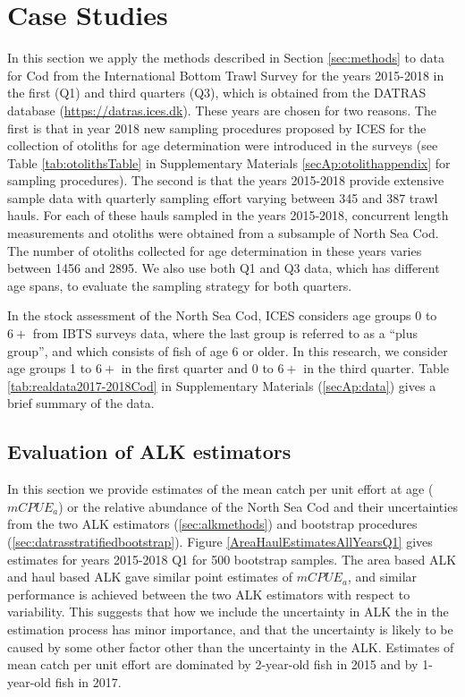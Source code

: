 \documentclass[a4paper 12pt]{article}
\numberwithin{equation}{section}
\begin{document}
\section{Case Studies}
\label{sec:data}
In this section we apply the methods described in Section \ref{sec:methods} to data for Cod from the International Bottom Trawl Survey for the years 2015-2018 in the first (Q1) and third quarters (Q3), which is obtained from the DATRAS database (\href{https://datras.ices.dk}{https://datras.ices.dk}). These years are chosen for two reasons. The first is that in year 2018 new sampling procedures proposed by ICES for the collection of otoliths for age determination were introduced in the surveys (see Table \ref{tab:otolithsTable} in Supplementary Materials \ref{secAp:otolithappendix} for sampling procedures). The second is that the years 2015-2018  provide extensive sample data with quarterly sampling effort varying between 345 and 387 trawl hauls.  For each of these hauls sampled in the years 2015-2018, concurrent length measurements and otoliths were obtained from a subsample of North Sea Cod. The number of otoliths collected for age determination in these years varies between 1456 and 2895. We also use both Q1 and Q3 data, which has different age spans, to evaluate the sampling strategy for both quarters. 

In the stock assessment of the North Sea Cod,  ICES considers age groups 0 to $6+$ from IBTS surveys data, where the last group is referred to as a ``plus group'', and which consists of fish of age 6 or older.  In this research, we consider age groups 1 to $6+$ in the first quarter and 0 to $6+$ in the third quarter. Table \ref{tab:realdata2017-2018Cod} in Supplementary Materials (\ref{secAp:data}) gives a brief summary of the data.

\subsection{Evaluation of ALK estimators}
\label{sec:EstimatesALK}
In this section we provide estimates of the mean catch per unit effort at age ($mCPUE_{a}$) or the relative abundance of the North Sea Cod  and their uncertainties from the two ALK estimators (\ref{sec:alkmethods}) and bootstrap procedures (\ref{sec:datrasstratifiedbootstrap}). Figure \ref{AreaHaulEstimatesAllYearsQ1} gives estimates for years 2015-2018 Q1 for 500 bootstrap samples. The area based ALK and haul based ALK gave similar point estimates of $mCPUE_{a}$, and similar performance is achieved between the two ALK estimators with respect to variability. This suggests that how we include the uncertainty in ALK the in the estimation process has minor importance, and that the uncertainty is likely to be caused by some other factor other than the uncertainty in the ALK. Estimates of mean catch per unit effort are dominated by  2-year-old fish in 2015 and by 1-year-old fish in 2017.
\end{document}

